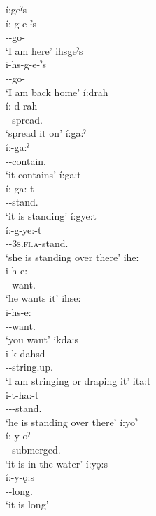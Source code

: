 \ea\label{ex:proth3}
\ea í:geˀs\\
\gll í:-g-e-ˀs\\
 {\prothetic}--go-{\habitual}\\
\glt `I am here'
\ex ihsgeˀs\\
\gll i-hs-g-e-ˀs\\
 {\prothetic}--go-{\habitual}\\
\glt `I am back home'
\ex í:drah\\
\gll í:-d-rah\\
 {\prothetic}--spread.{\noaspect}\\
\glt `spread it on'
\ex í:ga:ˀ\\
\gll í:-ga:ˀ\\
 {\prothetic}--contain.{\stative}\\
\glt `it contains'
\ex í:ga:t\\
\gll í:-ga:-t\\
 {\prothetic}--stand.{\stative}\\
\glt `it is standing'
\ex í:gye:t\\
\gll í:-g-ye:-t\\
 {\prothetic}-{\cislocative}-\textsc{3s.fi.a}-stand.{\stative}\\
\glt `she is standing over there'
\ex ihe:\\
\gll i-h-e:\\
 {\prothetic}--want.{\stative}\\
\glt `he wants it'
\ex ihse:\\
\gll i-hs-e:\\
 {\prothetic}--want.{\stative}\\
\glt `you want'
\ex ikda:s\\
\gll i-k-dahsd\\
 {\prothetic}--string.up.{\habitual}\\
\glt `I am stringing or draping it'
\ex ita:t\\
\gll i-t-ha:-t\\
 {\prothetic}-{\cislocative}--stand.{\stative}\\
\glt `he is standing over there'
\ex í:yoˀ\\
\gll í:-y-oˀ\\
 {\prothetic}--submerged.{\stative}\\
\glt `it is in the water'
\ex í:yǫ:s\\
\gll í:-y-ǫ:s\\
 {\prothetic}--long.{\stative}\\
\glt `it is long'
\z
\z

